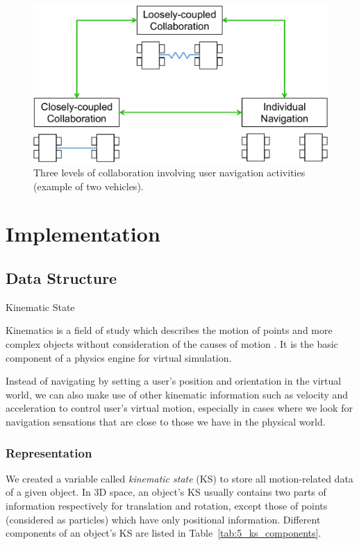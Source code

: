 \begin{figure}[htb]
  \centering
  \includegraphics[width=.8\textwidth]{figures/ch5/user_inter}
  \caption{\label{fig:5_user_inter}Three levels of collaboration involving user navigation activities (example of two vehicles).}
\end{figure}



\section{Implementation}
\subsection{Data Structure}

Kinematic State

Kinematics is a field of study which describes the motion of points and more complex objects without consideration of the causes of motion \citep{Beggs1983Kinematics}. It is the basic component of a physics engine for virtual simulation.

Instead of navigating by setting a user's position and orientation in the virtual world, we can also make use of other kinematic information such as velocity and acceleration to control user's virtual motion, especially in cases where we look for navigation sensations that are close to those we have in the physical world. 

\subsubsection{Representation}
We created a variable called \textit{kinematic state} (KS) to store all motion-related data of a given object. In 3D space, an object's KS usually contains two parts of information respectively for translation and rotation, except those of points (considered as particles) which have only positional information. Different components of an object's KS are listed in Table~\ref{tab:5_ks_components}.

